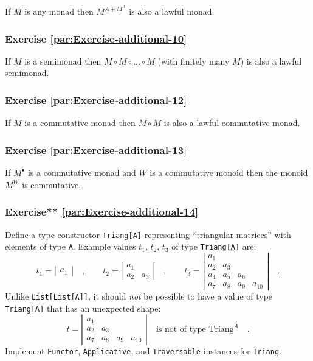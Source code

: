 If $M$ is any monad then $M^{A+M^{A}}$ is also a lawful monad.

\subsubsection{Exercise \label{par:Exercise-additional-10}\ref{par:Exercise-additional-10}}

If $M$ is a semimonad then $M\circ M\circ...\circ M$ (with finitely
many $M$) is also a lawful semimonad.

\subsubsection{Exercise \label{par:Exercise-additional-12}\ref{par:Exercise-additional-12}}

If $M$ is a commutative monad then $M\circ M$ is also a lawful commutative
monad.

\subsubsection{Exercise \label{par:Exercise-additional-13}\ref{par:Exercise-additional-13}}

If $M^{\bullet}$ is a commutative monad and $W$ is a commutative
monoid then the monoid $M^{W}$ is commutative.

\subsubsection{Exercise{*}{*} \label{par:Exercise-additional-14}\ref{par:Exercise-additional-14}}

Define a type constructor \lstinline!Triang[A]! representing \textsf{``}triangular
matrices\textsf{''} with elements of type \lstinline!A!. Example values $t_{1}$,
$t_{2}$, $t_{3}$ of type \lstinline!Triang[A]! are:
\[
t_{1}=\left|\begin{array}{c}
a_{1}\end{array}\right|\quad,\quad\quad t_{2}=\left|\begin{array}{cc}
a_{1}\\
a_{2} & a_{3}
\end{array}\right|\quad,\quad\quad t_{3}=\left|\begin{array}{cccc}
a_{1}\\
a_{2} & a_{3}\\
a_{4} & a_{5} & a_{6}\\
a_{7} & a_{8} & a_{9} & a_{10}
\end{array}\right|\quad.
\]
Unlike \lstinline!List[List[A]]!, it should \emph{not} be possible
to have a value of type \lstinline!Triang[A]! that has an unexpected
shape:
\[
t=\left|\begin{array}{cccc}
a_{1}\\
a_{2} & a_{3}\\
a_{7} & a_{8} & a_{9} & a_{10}
\end{array}\right|\quad\text{is not of type }\text{Triang}^{A}\quad.
\]
 Implement \lstinline!Functor!, \lstinline!Applicative!, and \lstinline!Traversable!
instances for \lstinline!Triang!.

